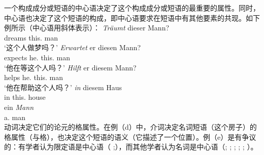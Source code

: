 一个构成成分或短语的中心语决定了这个构成成分或短语的最重要的属性。同时，中心语也决定了这个短语的构成，即中心语要求在短语中有其他要素的共现。如下例所示（中心语用斜体表示）：
\eal
\ex 
\gll \emph{Träumt} dieser Mann?\\
     dreams this.\nom{} man\\
\glt `这个人做梦吗？'
\ex 
\gll \emph{Erwartet} er diesen Mann?\\
	 expects he.\nom{} this.\acc{} man\\
\glt `他在等这个人吗？'
\ex 
\gll \emph{Hilft} er diesem Mann?\\
	 helps he.\nom{} this.\dat{} man\\
\glt `他在帮助这个人吗？'
\ex 
\gll \emph{in} diesem Haus\\
	 in this.\dat{} house\\
\ex 
\gll ein \emph{Mann}\\
	 a.\nom{} man\\
\zl
动词决定它们的论元的格属性。在例（d）中，介词决定名词短语（这个房子）的格属性（与格），也决定这个短语的语义（它描述了一个位置）。例（e）是有争议的：有学者认为限定语是中心语（\cite{Brame81a,Brame82a} \citealp[]{Hudson84a};\citealp{VH77a-u,Hellan86a,Abney87a,Netter94,Netter98a}），而其他学者认为名词是中心语（\citealp{vanLangendonck94a}; \citealp[]{ps2}; \citealp{Demske2001a};
\citealp[Section~6.6.1]{MuellerLehrbuch1}; \citealp{Hudson2004a}; \citealp{Bruening2009a}）。

